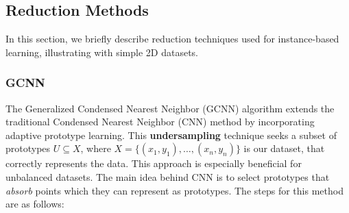 
\subsection{Reduction Methods}
In this section, we briefly describe reduction techniques used for instance-based learning, illustrating with simple 2D datasets.

\subsubsection{GCNN}

The Generalized Condensed Nearest Neighbor (GCNN) \cite{chang2006adaptive} algorithm extends the traditional Condensed Nearest Neighbor (CNN) method by incorporating adaptive prototype learning. This \textbf{undersampling} technique seeks a subset of prototypes $U \subseteq X$, where $X = \{(x_1, y_1), \ldots, (x_n, y_n)\}$ is our dataset, that correctly represents the data. This approach is especially beneficial for unbalanced datasets. The main idea behind CNN is to select prototypes that \textit{absorb} points which they can represent as prototypes. The steps for this method are as follows:

